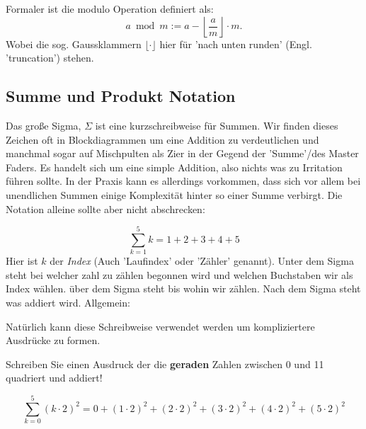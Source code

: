     Formaler ist die modulo Operation definiert als:
    $$ a{\bmod {m}}:=a-\left\lfloor {\frac {a}{m}}\right\rfloor \cdot m.$$
    Wobei die sog. Gaussklammern $\lfloor \cdot \rfloor$ hier für 'nach unten runden' (Engl. 'truncation') stehen. 




%     

\subsection{Summe und Produkt Notation}

Das große Sigma, $\Sigma$ ist eine kurzschreibweise für Summen. Wir finden dieses Zeichen oft in Blockdiagrammen um eine Addition zu verdeutlichen und manchmal sogar auf Mischpulten als Zier in der Gegend der 'Summe'/des Master Faders. Es handelt sich um eine simple Addition, also nichts was zu Irritation führen sollte. In der Praxis kann es allerdings vorkommen, dass sich vor allem bei unendlichen Summen einige Komplexität hinter so einer Summe verbirgt. Die Notation alleine sollte aber nicht abschrecken:

\begin{equation}
{\displaystyle \sum _{k=1}^{5}k = 1 + 2 + 3 + 4 + 5 }
\end{equation}
Hier ist $k$ der \emph{Index} (Auch 'Laufindex' oder 'Zähler' genannt). Unter dem Sigma steht bei welcher zahl zu zählen begonnen wird und welchen Buchstaben wir als Index wählen. über dem Sigma steht bis wohin wir zählen. Nach dem Sigma steht was addiert wird. Allgemein:



Natürlich kann diese Schreibweise verwendet werden um kompliziertere Ausdrücke zu formen.

\begin{question}
Schreiben Sie einen Ausdruck der die \textbf{geraden} Zahlen zwischen 0 und 11 quadriert und addiert!
\end{question}
\begin{answer}

$${\displaystyle \sum _{k=0}^{5} (k \cdot 2)^2 = 0 + (1 \cdot 2)^2 + (2 \cdot 2)^2 + (3 \cdot 2)^2 + (4 \cdot 2)^2 + (5 \cdot 2)^2}$$

\end{answer}


